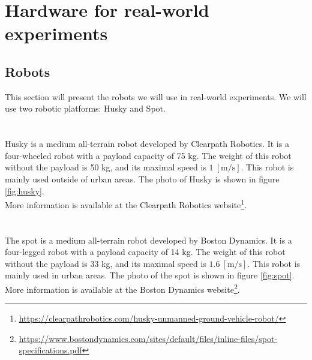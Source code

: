 \section{Hardware for real-world experiments}
    \subsection{Robots}
        This section will present the robots we will use in real-world experiments. We will use two robotic platforms: Husky and Spot.\\\\
        \\
        Husky is a medium all-terrain robot developed by Clearpath Robotics. It is a four-wheeled robot with a payload capacity of 75 kg. The weight of this robot without the payload is 50 kg, and its maximal speed is $1\:\mathrm{[m/s]}$. This robot is mainly used outside of urban areas. The photo of Husky is shown in figure \ref{fig:husky}.\\
        More information is available at the Clearpath Robotics website\footnote{\url{https://clearpathrobotics.com/husky-unmanned-ground-vehicle-robot/}}.\\\\
        \\
        The spot is a medium all-terrain robot developed by Boston Dynamics. It is a four-legged robot with a payload capacity of 14 kg. The weight of this robot without the payload is 33 kg, and its maximal speed is $1.6\:\mathrm{[m/s]}$. This robot is mainly used in urban areas. The photo of the spot is shown in figure \ref{fig:spot}.\\
        More information is available at the Boston Dynamics website\footnote{\url{https://www.bostondynamics.com/sites/default/files/inline-files/spot-specifications.pdf}}.\\


